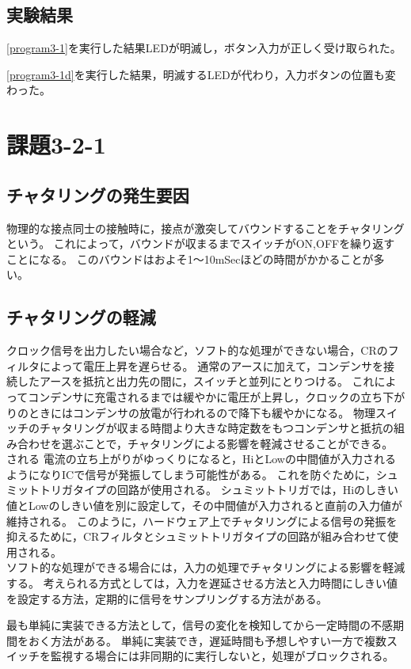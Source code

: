 \documentclass[a4paper,10pt]{jsarticle}
\begin{document}
\subsection{実験結果}
\ref{program3-1}を実行した結果LEDが明滅し，ボタン入力が正しく受け取られた。

\ref{program3-1d}を実行した結果，明滅するLEDが代わり，入力ボタンの位置も変わった。

\section{課題3-2-1}
\subsection{チャタリングの発生要因}
物理的な接点同士の接触時に，接点が激突してバウンドすることをチャタリングという。
これによって，バウンドが収まるまでスイッチがON,OFFを繰り返すことになる。
このバウンドはおよそ1〜10mSecほどの時間がかかることが多い。

\subsection{チャタリングの軽減}
クロック信号を出力したい場合など，ソフト的な処理ができない場合，CRのフィルタによって電圧上昇を遅らせる。
通常のアースに加えて，コンデンサを接続したアースを抵抗と出力先の間に，スイッチと並列にとりつける。
これによってコンデンサに充電されるまでは緩やかに電圧が上昇し，クロックの立ち下がりのときにはコンデンサの放電が行われるので降下も緩やかになる。
物理スイッチのチャタリングが収まる時間より大きな時定数をもつコンデンサと抵抗の組み合わせを選ぶことで，チャタリングによる影響を軽減させることができる。
される
電流の立ち上がりがゆっくりになると，HiとLowの中間値が入力されるようになりICで信号が発振してしまう可能性がある。
これを防ぐために，シュミットトリガタイプの回路が使用される。
シュミットトリガでは，Hiのしきい値とLowのしきい値を別に設定して，その中間値が入力されると直前の入力値が維持される。
このように，ハードウェア上でチャタリングによる信号の発振を抑えるために，CRフィルタとシュミットトリガタイプの回路が組み合わせて使用される。\cite{cpuno}\\


ソフト的な処理ができる場合には，入力の処理でチャタリングによる影響を軽減する。
考えられる方式としては，入力を遅延させる方法と入力時間にしきい値を設定する方法，定期的に信号をサンプリングする方法がある。

最も単純に実装できる方法として，信号の変化を検知してから一定時間の不感期間をおく方法がある。
単純に実装でき，遅延時間も予想しやすい一方で複数スイッチを監視する場合には非同期的に実行しないと，処理がブロックされる。
\end{document}
